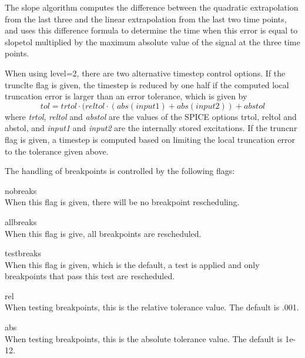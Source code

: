 The slope algorithm computes the difference between the quadratic
extrapolation from the last three and the linear extrapolation from
the last two time points, and uses this difference formula to
determine the time when this error is equal to {\vt slopetol}
multiplied by the maximum absolute value of the signal at the
three time points.

When using {\vt level=2}, there are two alternative timestep control
options.  If the {\vt trunclte} flag is given, the timestep is reduced
by one half if the computed local truncation error is larger than an
error tolerance, which is given by
\begin{displaymath}
tol = trtol\cdot(reltol\cdot(abs(input1) + abs(input2)) + abstol
\end{displaymath}
where {\it trtol}, {\it reltol} and {\it abstol} are the values of the
SPICE options {\vt trtol}, {\vt reltol} and {\vt abstol}, and {\it
input1} and {\it input2} are the internally stored excitations.  If
the {\vt truncnr} flag is given, a timestep is computed based on
limiting the local truncation error to the tolerance given above. 

The handling of breakpoints is controlled by the following flags:

\begin{description}
\item{\vt nobreaks}\\
When this flag is given, there will be no breakpoint rescheduling.

\item{\vt allbreaks}\\
When this flag is give, all breakpoints are rescheduled.

\item{\vt testbreaks}\\
When this flag is given, which is the default, a test is applied and
only breakpoints that pass this test are rescheduled.

\item{\vt rel}\\
When testing breakpoints, this is the relative tolerance value.  The
default is .001.

\item{\vt abs}\\
When testing breakpoints, this is the absolute tolerance value.  The
default is 1e-12.
\end{description}

